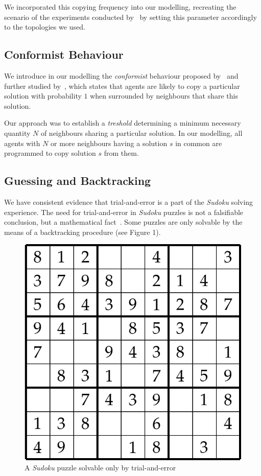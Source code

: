 \documentclass[letterpaper]{article}
\begin{document}
We incorporated this copying frequency into our modelling, recreating the scenario of the experiments conducted by~\cite{farenzena:collabem} by setting this parameter accordingly to the topologies we used.

\subsection{Conformist Behaviour}

We introduce in our modelling the {\em conformist} behaviour proposed by~\cite{cefferson:conformists} and further studied by~\cite{farenzena:collabem}, which states that agents are likely to copy a particular solution with probability $1$ when surrounded by neighbours that share this solution. 

Our approach was to establish a {\em treshold} determining a minimum necessary quantity $N$ of neighbours sharing a particular solution. In our modelling, all agents with $N$ or more neighbours having a solution $s$ in common are programmed to copy solution $s$ from them.

\subsection{Guessing and Backtracking}

We have consistent evidence that trial-and-error is a part of the {\em Sudoku} solving experience. The need for trial-and-error in {\em Sudoku} puzzles is not a falsifiable conclusion, but a mathematical fact~\cite{davis:mathsudoku}. Some puzzles are only solvable by the means of a backtracking procedure (see Figure 1).

\begin{figure}
\centering
\includegraphics[scale=0.30]{trial_and_error_sudoku}
\caption{A {\em Sudoku} puzzle solvable only by trial-and-error}
\label{fig:trial_and_error_sudoku}
\end{figure}
\end{document}
